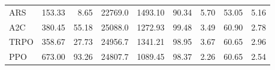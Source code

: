 \begin{samepage}
\begin{center}
\begin{tabular}{l|rr|rr|rr|rr}
    ARS          &   153.33 &     8.65 &    22769.0 &    1493.10 &   90.34 &    5.70 &   53.05 &    5.16 \\
    A2C          &   380.45 &    55.18 &    25088.0 &    1272.93 &   99.48 &    3.49 &   60.90 &    2.78 \\
    TRPO         &   358.67 &    27.73 &    24956.7 &    1341.21 &   98.95 &    3.67 &   60.65 &    2.96 \\
    PPO          &   673.00 &    93.26 &    24807.7 &    1089.45 &   98.37 &    2.26 &   60.65 &    2.54 \\
    \bottomrule
  \end{tabular}
\end{center}
\end{samepage}

